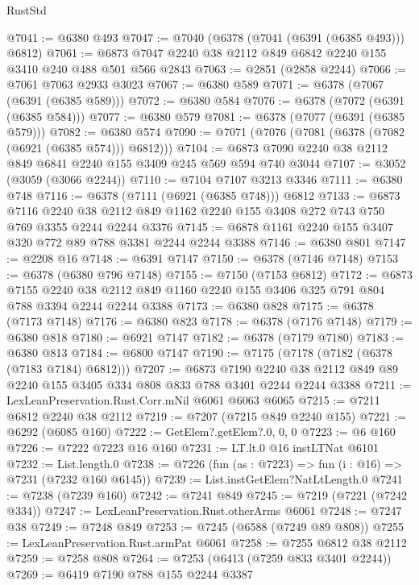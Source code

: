 \begin{lexlean}{RustStd}
\begin{coremodule}
@7041 := @6380 @493
@7047 := @7040 (@6378 (@7041 (@6391 (@6385 @493))) @6812)
@7061 := @6873 @7047 @2240 @38 @2112 @849 @6842 @2240 @155 @3410 @240 @488 @501 @566 @2843
@7063 := @2851 (@2858 @2244)
@7066 := @7061 @7063 @2933 @3023
@7067 := @6380 @589
@7071 := @6378 (@7067 (@6391 (@6385 @589)))
@7072 := @6380 @584
@7076 := @6378 (@7072 (@6391 (@6385 @584)))
@7077 := @6380 @579
@7081 := @6378 (@7077 (@6391 (@6385 @579)))
@7082 := @6380 @574
@7090 := @7071 (@7076 (@7081 (@6378 (@7082 (@6921 (@6385 @574))) @6812)))
@7104 := @6873 @7090 @2240 @38 @2112 @849 @6841 @2240 @155 @3409 @245 @569 @594 @740 @3044
@7107 := @3052 (@3059 (@3066 @2244))
@7110 := @7104 @7107 @3213 @3346
@7111 := @6380 @748
@7116 := @6378 (@7111 (@6921 (@6385 @748))) @6812
@7133 := @6873
    @7116
    @2240
    @38
    @2112
    @849
    @1162
    @2240
    @155
    @3408
    @272
    @743
    @750
    @769
    @3355
    @2244
    @2244
    @3376
@7145 := @6878 @1161 @2240 @155 @3407 @320 @772 @89 @788 @3381 @2244 @2244 @3388
@7146 := @6380 @801
@7147 := @2208 @16
@7148 := @6391 @7147
@7150 := @6378 (@7146 @7148)
@7153 := @6378 (@6380 @796 @7148)
@7155 := @7150 (@7153 @6812)
@7172 := @6873
    @7155
    @2240
    @38
    @2112
    @849
    @1160
    @2240
    @155
    @3406
    @325
    @791
    @804
    @788
    @3394
    @2244
    @2244
    @3388
@7173 := @6380 @828
@7175 := @6378 (@7173 @7148)
@7176 := @6380 @823
@7178 := @6378 (@7176 @7148)
@7179 := @6380 @818
@7180 := @6921 @7147
@7182 := @6378 (@7179 @7180)
@7183 := @6380 @813
@7184 := @6800 @7147
@7190 := @7175 (@7178 (@7182 (@6378 (@7183 @7184) @6812)))
@7207 := @6873
    @7190
    @2240
    @38
    @2112
    @849
    @89
    @2240
    @155
    @3405
    @334
    @808
    @833
    @788
    @3401
    @2244
    @2244
    @3388
@7211 := LexLeanPreservation.Rust.Corr.mNil @6061 @6063 @6065
@7215 := @7211 @6812 @2240 @38 @2112
@7219 := @7207 (@7215 @849 @2240 @155)
@7221 := @6292 (@6085 @160)
@7222 := GetElem?.getElem?.{0, 0, 0}
@7223 := @6 @160
@7226 := @7222 @7223 @16 @160
@7231 := LT.lt.{0} @16 instLTNat @6101
@7232 := List.length.{0}
@7238 := @7226 (fun (as : @7223) => fun (i : @16) => @7231 (@7232 @160 @6145))
@7239 := List.instGetElem?NatLtLength.{0}
@7241 := @7238 (@7239 @160)
@7242 := @7241 @849
@7245 := @7219 (@7221 (@7242 @334))
@7247 := LexLeanPreservation.Rust.otherArms @6061
@7248 := @7247 @38
@7249 := @7248 @849
@7253 := @7245 (@6588 (@7249 @89 @808))
@7255 := LexLeanPreservation.Rust.armPat @6061
@7258 := @7255 @6812 @38 @2112
@7259 := @7258 @808
@7264 := @7253 (@6413 (@7259 @833 @3401 @2244))
@7269 := @6419 @7190 @788 @155 @2244 @3387

\end{coremodule}
\end{lexlean}
